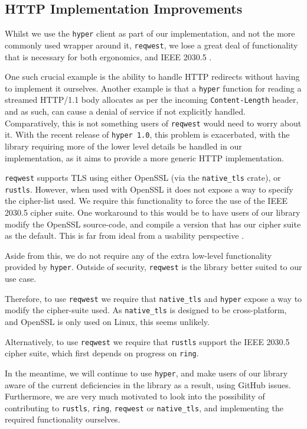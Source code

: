 \subsection{HTTP Implementation Improvements}
Whilst we use the \texttt{hyper} client as part of our implementation, and not the more commonly used wrapper around it, \texttt{reqwest}, we lose a great deal of functionality that is necessary for both ergonomics, and IEEE 2030.5 \cite{reqwest}. 

One such crucial example is the ability to handle HTTP redirects without having to implement it ourselves.
Another example is that a \texttt{hyper} function for reading a streamed HTTP/1.1 body allocates as per the incoming \texttt{Content-Length} header, and as such, can cause a denial of service if not explicitly handled. Comparatively, this is not something users of \texttt{reqwest} would need to worry about it.
With the recent release of \texttt{hyper 1.0}, this problem is exacerbated, with the library requiring more of the lower level details be handled in our implementation, as it aims to provide a more generic HTTP implementation.   

\texttt{reqwest} supports TLS using either OpenSSL (via the \texttt{native\_tls} crate), or \texttt{rustls}. However, when used with OpenSSL it does not expose a way to specify the cipher-list used. We require this functionality to force the use of the IEEE 2030.5 cipher suite. One workaround to this would be to have users of our library modify the OpenSSL source-code, and compile a version that has our cipher suite as the default. This is far from ideal from a usability perspective \cite{reqwestopenssl}.

Aside from this, we do not require any of the extra low-level functionality provided by \texttt{hyper}. Outside of security, \texttt{reqwest} is the library better suited to our use case.

Therefore, to use \texttt{reqwest} we require that \texttt{native\_tls} and \texttt{hyper} expose a way to modify the cipher-suite used. As \texttt{native\_tls} is designed to be cross-platform, and OpenSSL is only used on Linux, this seems unlikely.

Alternatively, to use \texttt{reqwest} we require that \texttt{rustls} support the IEEE 2030.5 cipher suite, which first depends on progress on \texttt{ring}.

In the meantime, we will continue to use \texttt{hyper}, and make users of our library aware of the current deficiencies in the library as a result, using GitHub issues.
Furthermore, we are very much motivated to look into the possibility of contributing to \texttt{rustls}, \texttt{ring}, \texttt{reqwest} or \texttt{native\_tls}, and implementing the required functionality ourselves.


